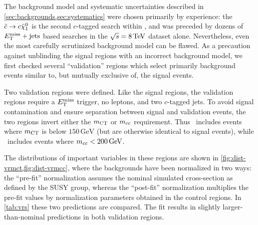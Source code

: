 The background model and systematic uncertainties described in \cref{sec:backgrounds,sec:systematics}
were chosen primarily by experience: the $\tilde{c} \to c \tilde{\chi}_1^0$ is the second
$c$-tagged search within \atlas, and was preceded by dozens of $E_{\rm T}^{\rm miss} + \text{jets}$ based searches in the $\sqrt{s} = 8\,\text{TeV}$ dataset alone.
Nevertheless, even the most carefully scrutinized background model can
be flawed. As a precaution against unblinding the signal regions with an
incorrect background model, we first checked several ``validation'' regions which select primarily background events similar to, but mutually exclusive of, the signal events.

Two validation regions were defined. Like the signal regions, the validation regions require a $E_{\rm T}^{\rm miss}$
trigger, no leptons, and two $c$-tagged jets. To avoid signal contamination
and ensure separation between signal and validation events, the two regions
invert either the $m_{\rm CT}$ or $m_{cc}$ requirement. Thus \vrmct\ includes events where $m_{\rm CT}$ is below $150\,\text{GeV}$ (but are otherwise identical to signal events), while \vrmcc\ includes events where $m_{cc} < 200\,\text{GeV}$.

The distributions of important variables in these regions are shown in \cref{fig:dist-vrmct,fig:dist-vrmcc}, where the backgrounds have been normalized in two ways: the ``pre-fit'' normalization assumes the nominal simulated cross-section as defined by the SUSY group, whereas the ``post-fit'' normalization multiplies the pre-fit values by normalization
parameters obtained in the control regions. In \cref{tab:vrs} these two
predictions are compared. The fit results in slightly larger-than-nominal predictions in both validation regions.

